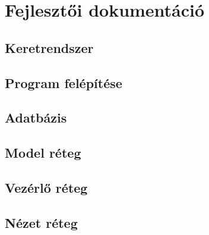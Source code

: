 \chapter{Fejlesztői dokumentáció} %
\label{ch:user}

\section{Keretrendszer}
\section{Program felépítése}
\section{Adatbázis}
\section{Model réteg}
\section{Vezérlő réteg}
\section{Nézet réteg}